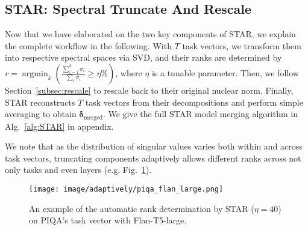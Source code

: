 






\subsection{STAR: Spectral Truncate And Rescale}\label{subsec:STAR}

Now that we have elaborated on the two key components of STAR, we explain the complete workflow in the following. With $T$ task vectors, we transform them into respective spectral spaces via SVD, and their ranks are determined by $r = \mathop{\arg\min}_{k} \left( \frac{\sum_{i=1}^k \sigma_i}{\sum_i \sigma_i} \geq \eta\% \right)$, where $\eta$ is a tunable parameter. Then, we follow Section~\ref{subsec:rescale} to rescale back to their original nuclear norm. Finally, STAR reconstructs $T$ task vectors from their decompositions and perform simple averaging to obtain $\bm{\delta}_{\text{merged}}$. We give the full STAR model merging algorithm in Alg.~\ref{alg:STAR} in appendix.




We note that as the distribution of singular values varies both within and across task vectors, truncating components adaptively allows different ranks across not only tasks and even layers (e.g. Fig.~\ref{fig:rank_viz}). 

\begin{figure}[t]    
    \centering
    \texttt{[image: image/adaptively/piqa\_flan\_large.png]}
    \caption{An example of the automatic rank determination by STAR ($\eta=40$) on PIQA's task vector with Flan-T5-large.}
    \label{fig:rank_viz}
\end{figure}


